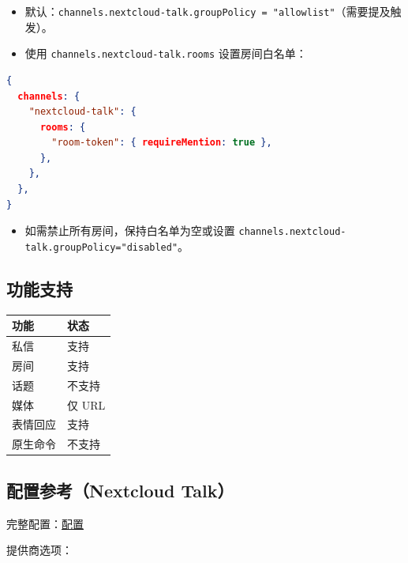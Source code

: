\begin{itemize}
  \item 默认：\texttt{channels.nextcloud-talk.groupPolicy = "allowlist"}（需要提及触发）。
  \item 使用 \texttt{channels.nextcloud-talk.rooms} 设置房间白名单：
\end{itemize}


\begin{lstlisting}[language=json]
{
  channels: {
    "nextcloud-talk": {
      rooms: {
        "room-token": { requireMention: true },
      },
    },
  },
}
\end{lstlisting}


\begin{itemize}
  \item 如需禁止所有房间，保持白名单为空或设置 \texttt{channels.nextcloud-talk.groupPolicy="disabled"}。
\end{itemize}


\subsection{功能支持}



\begin{table}[h]
\centering
\small
\begin{tabular}{|l|l|}
\hline
功能 & 状态 \\
\hline
私信 & 支持 \\
\hline
房间 & 支持 \\
\hline
话题 & 不支持 \\
\hline
媒体 & 仅 URL \\
\hline
表情回应 & 支持 \\
\hline
原生命令 & 不支持 \\
\hline
\end{tabular}
\end{table}



\subsection{配置参考（Nextcloud Talk）}


完整配置：\href{/gateway/configuration}{配置}

提供商选项：

